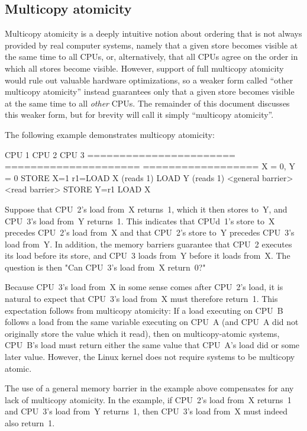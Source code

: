 \subsection{Multicopy atomicity}

Multicopy atomicity is a deeply intuitive notion about ordering that is
not always provided by real computer systems, namely that a given store
becomes visible at the same time to all CPUs, or, alternatively, that all
CPUs agree on the order in which all stores become visible.
However, support of full multicopy atomicity would rule out valuable
hardware optimizations, so a weaker form called ``other multicopy atomicity''
instead guarantees only that a given store becomes visible at the same
time to all \emph{other} CPUs.
The remainder of this document discusses this weaker form, but for brevity
will call it simply ``multicopy atomicity''.

The following example demonstrates multicopy atomicity:

\begin{VerbatimU}
	CPU 1                   CPU 2                 CPU 3
	======================= ===================== ==================
		{ X = 0, Y = 0 }
	STORE X=1               r1=LOAD X (reads 1)   LOAD Y (reads 1)
	                        <general barrier>     <read barrier>
	                        STORE Y=r1            LOAD X
\end{VerbatimU}

Suppose that CPU~2's load from~X returns~1, which it then stores to~Y,
and CPU~3's load from~Y returns~1.
This indicates that CPUd~1's store to~X precedes CPU~2's load from~X and
that CPU~2's store to~Y precedes CPU~3's load from~Y.
In addition, the memory barriers guarantee that CPU~2 executes its load
before its store, and CPU~3 loads from~Y before it loads from~X.
The question is then "Can CPU~3's load from~X return~0?"

Because CPU~3's load from~X in some sense comes after CPU~2's load, it
is natural to expect that CPU~3's load from~X must therefore return~1.
This expectation follows from multicopy atomicity:
If a load executing on CPU~B follows a load from the same variable
executing on CPU~A (and CPU~A did not originally store the value which
it read), then on multicopy-atomic systems, CPU~B's load must return
either the same value that CPU~A's load did or some later value.
However, the Linux kernel does not require systems to be multicopy atomic.

The use of a general memory barrier in the example above compensates
for any lack of multicopy atomicity.
In the example, if CPU~2's load from~X returns~1 and CPU~3's load from~Y
returns~1, then CPU~3's load from~X must indeed also return~1.

